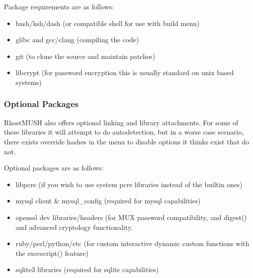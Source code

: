 \documentclass[letterpaper,10pt,english]{sphinxmanual}
\begin{document}
\sphinxAtStartPar
Package requirements are as follows:
\begin{itemize}
\item {} 
\sphinxAtStartPar
bash/ksh/dash (or compatible shell \sphinxhyphen{} for use with build menu)

\item {} 
\sphinxAtStartPar
glibc and gcc/clang (compiling the code)

\item {} 
\sphinxAtStartPar
git (to clone the source and maintain patches)

\item {} 
\sphinxAtStartPar
libcrypt (for password encryption \sphinxhyphen{} this is usually standard on unix based systems)

\end{itemize}


\subsubsection{Optional Packages}
\label{\detokenize{install:optional-packages}}
\sphinxAtStartPar
RhostMUSH also offers optional linking and library attachments.
For some of these libraries it will attempt to do auto\sphinxhyphen{}detection,
but in a worse case scenario, there exists override hashes in the menu to disable options it thinks exist that do not.

\sphinxAtStartPar
Optional packages are as follows:
\begin{itemize}
\item {} 
\sphinxAtStartPar
libpcre (if you wish to use system pcre libraries instead of the built\sphinxhyphen{}in ones)

\item {} 
\sphinxAtStartPar
mysql client \& mysql\_config (required for mysql capabilities)

\item {} 
\sphinxAtStartPar
openssl dev libraries/headers (for MUX password compatibility, and digest() and advanced cryptology functionality.

\item {} 
\sphinxAtStartPar
ruby/perl/python/etc (for custom interactive dynamic custom functions with the execscript() feature)

\item {} 
\sphinxAtStartPar
sqlite3 libraries (required for sqlite capabilities)

\end{itemize}
\end{document}

